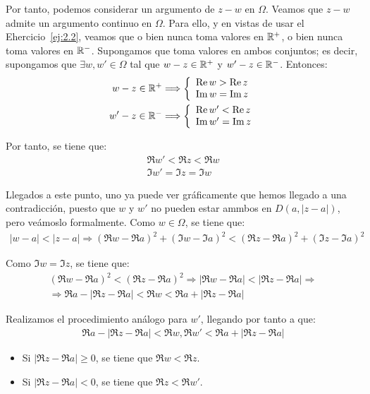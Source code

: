 \begin{ejercicio}
\begin{description}
        Por tanto, podemos considerar un argumento de $z-w$ en $\Omega$. Veamos que $z-w$ admite un argumento continuo en $\Omega$. Para ello, y en vistas de usar el Ehercicio~\ref{ej:2.2}, veamos que o bien nunca toma valores en $\mathbb{R}^+$, o bien nunca toma valores en $\mathbb{R}^-$. Supongamos que toma valores en ambos conjuntos; es decir, supongamos que $\exists w,w'\in \Omega$ tal que $w-z\in \mathbb{R}^+$ y $w'-z\in \mathbb{R}^-$. Entonces:
        \begin{align*}
            w-z\in \mathbb{R}^+ & \Longrightarrow \left\{\begin{array}{l}
                \operatorname{Re} w > \operatorname{Re} z\\
                \operatorname{Im} w = \operatorname{Im} z
            \end{array}\right.\\
            w'-z\in \mathbb{R}^- & \Longrightarrow \left\{\begin{array}{l}
                \operatorname{Re} w' < \operatorname{Re} z\\
                \operatorname{Im} w' = \operatorname{Im} z
            \end{array}\right.
        \end{align*}

        Por tanto, se tiene que:
        \begin{align*}
            \Re w' < \Re z < \Re w\\
            \Im w' = \Im z = \Im w
        \end{align*}

        Llegados a este punto, uno ya puede ver gráficamente que hemos llegado a una contradicción, puesto que $w$ y $w'$ no pueden estar ammbos en $D(a,|z-a|)$, pero veámoslo formalmente.
        Como $w\in \Omega$, se tiene que:
        \begin{align*}
            |w-a| < |z-a|\Longrightarrow \left(\Re w-\Re a\right)^2+\left(\Im w-\Im a\right)^2 < \left(\Re z-\Re a\right)^2+\left(\Im z-\Im a\right)^2
        \end{align*}

        Como $\Im w=\Im z$, se tiene que:
        \begin{multline*}
            \left(\Re w-\Re a\right)^2<\left(\Re z-\Re a\right)^2
            \Longrightarrow |\Re w-\Re a|<|\Re z-\Re a|\Longrightarrow \\ \Longrightarrow
            \Re a - |\Re z -\Re a| < \Re w < \Re a + |\Re z - \Re a|
        \end{multline*}

        Realizamos el procedimiento análogo para $w'$, llegando por tanto a que:
        \begin{align*}
            \Re a - |\Re z -\Re a| < \Re w,\Re w' < \Re a + |\Re z - \Re a|
        \end{align*}
        \begin{itemize}
            \item Si $|\Re z -\Re a| \geq 0$, se tiene que $\Re w<\Re z$.
            \item Si $|\Re z -\Re a| < 0$, se tiene que $\Re z<\Re w'$.
        \end{itemize}


\end{description}
\end{ejercicio}
